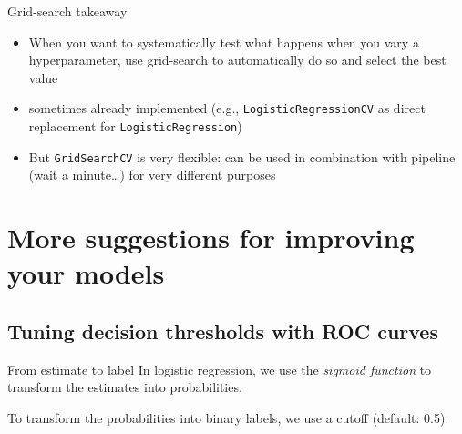 \documentclass[compress]{beamer}
\begin{document}
\begin{frame}{Grid-search takeaway}
\begin{itemize}[<+->]
	\item When you want to systematically test what happens when you vary a hyperparameter, use grid-search to automatically do so and select the best value
	\item sometimes already implemented (e.g., \texttt{LogisticRegressionCV} as direct replacement for \texttt{LogisticRegression})
	\item But \texttt{GridSearchCV} is very flexible: can be used in combination with pipeline (wait a minute\ldots) for very different purposes
\end{itemize}


\end{frame}











\section[More suggestions ]{More suggestions for improving your models}



\subsection{Tuning decision thresholds with ROC curves}

\begin{frame}{From estimate to label}
In logistic regression, we use the \textit{sigmoid function} to transform the estimates into probabilities.

To transform the probabilities into binary labels, we use a cutoff (default: 0.5).
\end{frame}
\end{document}
